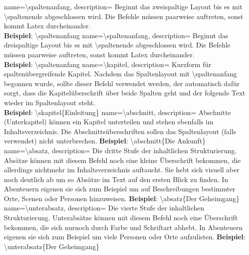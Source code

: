 {
    name={\textbackslash spaltenanfang},
    description={
            Beginnt das zweispaltige Layout bis es mit \textbackslash spaltenende abgeschlossen wird. Die Befehle müssen paarweise auftreten, sonst kommt Latex durcheinander.\\
            \textbf{Beispiel}: \textbackslash spaltenanfang}
}
{
    name={\textbackslash spaltenanfang},
    description={
            Beginnt das dreispaltige Layout bis es mit \textbackslash spaltenende abgeschlossen wird. Die Befehle müssen paarweise auftreten, sonst kommt Latex durcheinander.\\
            \textbf{Beispiel}: \textbackslash spaltenanfang}
}
{
    name={\textbackslash kapitel},
    description={
            Kurzform für spaltenübergreifende Kapitel. Nachdem das Spaltenlayout mit \textbackslash spaltenanfang begonnen wurde, sollte dieser Befehl verwendet werden, der automatisch dafür sorgt, dass die Kapitelüberschrift über beide Spalten geht und der folgende Text wieder im Spaltenlayout steht.\\
            \textbf{Beispiel}: \textbackslash skapitel\{Einleitung\}
        }
}
{
    name={\textbackslash abschnitt},
    description={
            Abschnitte (Unterkapitel) können ein Kapitel unterteilen und stehen ebenfalls im Inhaltsverzeichnis. Die Abschnittsüberschriften sollen das Spaltenlayout (falls verwendet) nicht unterbrechen.\newline
            \textbf{Beispiel}: \textbackslash abschnitt\{Die Ankunft\}
        }
}
{
    name={\textbackslash absatz},
    description={
            Die dritte Stufe der inhaltlichen Strukturierung. Absätze können mit diesem Befehl noch eine kleine Überschrift bekommen, die allerdings nichtmehr im Inhaltsverzeichnis auftaucht. Sie hebt sich visuell aber noch deutlich ab um so Absätze im Text auf den ersten Blick zu finden. In Abenteuern eigenen sie sich zum Beispiel um auf Beschreibungen bestimmter Orte, Scenen oder Personen hinzuweisen.
            \newline
            \textbf{Beispiel}: \textbackslash absatz\{Der Geheimgang\}
        }
}
{
    name={\textbackslash unterabsatz},
    description={
            Die vierte Stufe der inhaltlichen Strukturierung. Unterabsätze können mit diesem Befehl noch eine Überschrift bekommen, die sich nurnoch durch Farbe und Schriftart abhebt. In Abenteuern eigenen sie sich zum Beispiel um viele Personen oder Orte aufzulisten.
            \newline
            \textbf{Beispiel}: \textbackslash unterabsatz\{Der Geheimgang\}
        }
}

